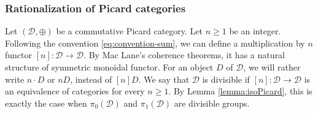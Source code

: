 \documentclass[JEP,XML,SOM,Unicode,published]{cedram}
\theoremstyle{plain}
\theoremstyle{definition}
\newcommand{\Dcal}{\mathcal D}
\begin{document}
\subsubsection{Rationalization of Picard categories}\label{subsubsec:rationalization-picard-categories}
Let $(\Dcal,\oplus)$ be a commutative Picard category. Let $n\geq 1$ be an integer. Following the convention \eqref{eq:convention-sum}, we can define a multiplication by $n$ functor $[n]\colon\Dcal\to\Dcal$. By Mac Lane's coherence theorems, it has a natural structure of symmetric monoidal functor. For an object $D$ of $\Dcal$, we will rather write $n\cdot D$ or $nD$, instead of $[n]D$. We say that $\Dcal$ is divisible if $[n]: \Dcal \to \Dcal$ is an equivalence of categories for every $n\geq 1$. By Lemma \ref{lemma:isoPicard}, this is exactly the case when $\pi_0(\Dcal)$ and $\pi_1(\Dcal)$ are divisible groups.
\end{document}
